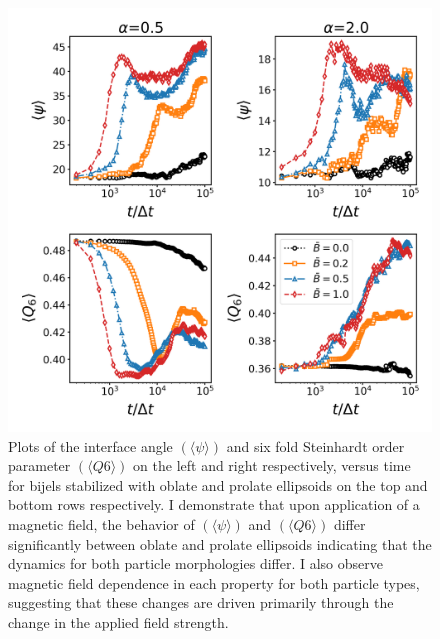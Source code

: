 \begin{figure} 
\centering 
\includegraphics[scale=0.5]{../figures/results/paper2/interface_angle-nint-field_on.png} 
\caption{Plots of the interface angle $(\langle \psi \rangle)$ and six fold Steinhardt order parameter $(\langle Q6 \rangle)$ on the left and right respectively, 
         versus time for bijels stabilized with oblate and prolate ellipsoids on the top and bottom rows respectively. I demonstrate that upon application 
         of a magnetic field, the behavior of $(\langle \psi \rangle)$ and $(\langle Q6 \rangle)$ differ significantly between oblate and prolate ellipsoids 
         indicating that the dynamics for both particle morphologies differ. I also observe magnetic field dependence in each property for both particle types, 
         suggesting that these changes are driven primarily through the change in the applied field strength.} 
\label{fig:interface_angle-nint-field_on} 
\end{figure}

